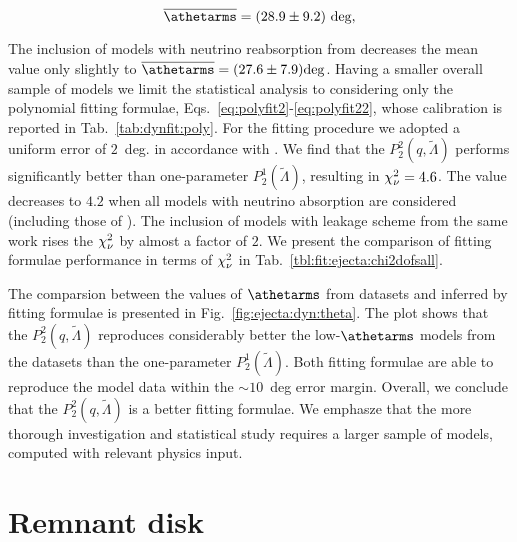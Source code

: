 \begin{equation}
\overline{\athetarms} = (28.9 \pm 9.2)~\text{deg},
\end{equation}

The inclusion of models with neutrino reabsorption from \citet{Radice:2018pdn} decreases the mean
value only slightly to $\overline{\athetarms}=(27.6 \pm 7.9) \text{deg}$.
Having a smaller overall sample of models we limit the statistical analysis to considering 
only the polynomial fitting formulae, Eqs.~\eqref{eq:polyfit2}-\eqref{eq:polyfit22}, whose 
calibration is reported in Tab.~\ref{tab:dynfit:poly}.
For the fitting procedure we adopted a uniform error of $2$~deg. in accordance with
\citet{Radice:2018pdn}.
We find that the $P_2^2(q,\tilde\Lambda)$ performs significantly better than one-parameter 
$P_2^1(\tilde\Lambda)$, resulting in $\chi_{\nu}^2=4.6$. The value decreases to $4.2$ when all models 
with neutrino absorption are considered (including those of \citet{Radice:2018pdn}).
The inclusion of models with leakage scheme from the same work rises the $\chi_{\nu}^2$ by almost 
a factor of $2$.
We present the comparison of fitting formulae performance in terms of $\chi_{\nu}^2$ in 
Tab.~\ref{tbl:fit:ejecta:chi2dofsall}.

The comparsion between the values of $\athetarms$ from datasets and inferred by 
fitting formulae is presented in Fig.~\ref{fig:ejecta:dyn:theta}.
The plot shows that the $P_2^2(q,\tilde{\Lambda})$ reproduces considerably better 
the low-$\athetarms$ models from the datasets than the one-parameter $P_2^1(\tilde{\Lambda})$.
Both fitting formulae are able to reproduce the model data within the $\sim 10$~deg
error margin.
Overall, we conclude that the $P_2^2(q,\tilde{\Lambda})$ is a better fitting formulae.
We emphasze that the more thorough investigation and statistical study requires a larger 
sample of models, computed with relevant physics input.


\section{Remnant disk}
\label{sec:stat:remdisk}

